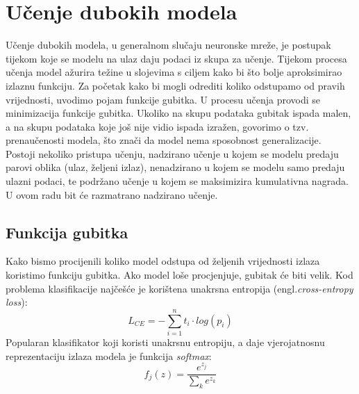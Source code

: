 \documentclass[times, utf8, zavrsni, numeric]{fer}
\begin{document}
\section{Učenje dubokih modela}
Učenje dubokih modela, u generalnom slučaju neuronske mreže, je postupak tijekom koje se modelu na ulaz daju podaci iz skupa za učenje. Tijekom procesa učenja model ažurira težine u slojevima s ciljem kako bi što bolje aproksimirao izlaznu funkciju. Za početak kako bi mogli odrediti koliko odstupamo od pravih vrijednosti, uvodimo pojam funkcije gubitka. U procesu učenja provodi se minimizacija funkcije gubitka. Ukoliko na skupu podataka gubitak ispada malen, a na skupu podataka koje još nije vidio ispada izražen, govorimo o tzv. prenaučenosti modela, što znači da model nema sposobnost generalizacije.\\
Postoji nekoliko pristupa učenju, nadzirano učenje u kojem se modelu predaju parovi oblika (ulaz, željeni izlaz), nenadzirano u kojem se modelu samo predaju ulazni podaci, te podržano učenje u kojem se maksimizira kumulativna nagrada. U ovom radu bit će razmatrano nadzirano učenje.\pagebreak
\subsection{Funkcija gubitka}
Kako bismo procijenili koliko model odstupa od željenih vrijednosti izlaza koristimo funkciju gubitka. Ako model loše procjenjuje, gubitak će biti velik. 
Kod problema klasifikacije najčešće je korištena unakrsna entropija (engl.\textit{cross-entropy loss}):
\begin{equation}
L_{CE}=-\sum_{i=1}^{n}t_{i}\cdot log(p_{i})
\label{eq:Aktivacija}
\end{equation}
Popularan klasifikator koji koristi unakrsnu entropiju, a daje vjerojatnosnu reprezentaciju izlaza modela je funkcija \textit{softmax}:
\begin{equation}
f_{j}(z) = \frac{e^{{z_{j}}}}{\sum_{k}^{}e^{z_{k}}}
\label{eq:Aktivacija}
\end{equation}
\end{document}
